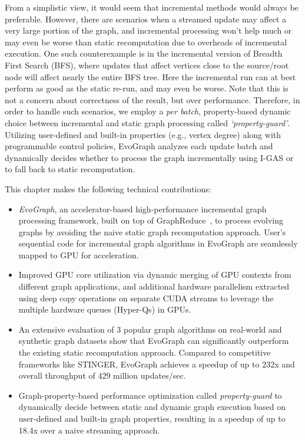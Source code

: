 From a simplistic view, it would seem that incremental methods would always be preferable.  However, there are scenarios when a streamed update may affect a very large portion of the graph, and incremental processing won't help much or may even be worse than static recomputation due to overheads of incremental execution. One such counterexample is in the incremental version of Breadth First Search (BFS), where updates that affect vertices close to the source/root node will affect nearly the entire BFS tree. Here the incremental run can at best perform as good as the static re-run, and may even be worse. Note that this is not a concern about correctness of the result, but over performance.  Therefore, in order to handle such scenarios, we employ a \textit{per batch}, property-based dynamic choice between incremental and static graph processing called \textit{‘property-guard’}. Utilizing user-defined and built-in properties (e.g., vertex degree) along with programmable control policies, EvoGraph analyzes each update batch and dynamically decides whether to process the graph incrementally using I-GAS or to fall back to static recomputation. 

This chapter makes the following technical contributions:
\begin{itemize}
 \item \textit{EvoGraph}, an accelerator-based high-performance incremental graph processing framework, built on top of GraphReduce~\cite{GR}, to process evolving graphs by avoiding the naive static graph recomputation approach. User's sequential code for incremental graph algorithms in EvoGraph are seamlessly mapped to GPU for acceleration. 
 \item Improved GPU core utilization via dynamic merging of GPU contexts from different graph applications, and additional hardware parallelism extracted using deep copy operations on separate CUDA streams to leverage the multiple hardware queues (Hyper-Qs) in GPUs.
 \item An extensive evaluation of 3 popular graph algorithms on real-world and synthetic graph datasets show that EvoGraph can significantly outperform the existing static recomputation approach. Compared to competitive frameworks like STINGER, EvoGraph achieves a speedup of up to 232x and overall throughput of 429 million updates/sec.
 \item Graph-property-based performance optimization called \textit{property-guard} to dynamically decide between static and dynamic graph execution based on user-defined and built-in graph properties, resulting in a speedup of up to 18.4x over a naive streaming approach.  
\end{itemize}

